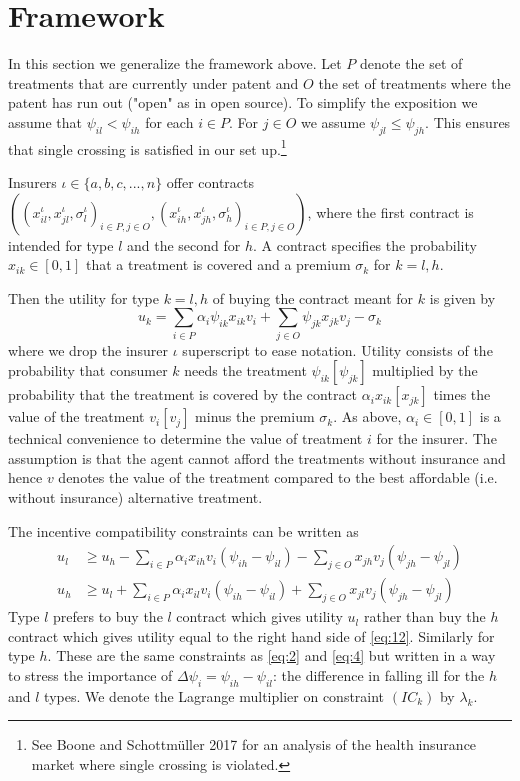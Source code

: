 \documentclass[a4paper,12pt]{article}
\makeatletter
\newcommand{\citeprocitem}[2]{\hyper@linkstart{cite}{citeproc_bib_item_#1}#2\hyper@linkend}
\makeatother
\begin{document}
\section{Framework}
\label{sec:org62fbe65}

In this section we generalize the framework above. Let \(P\) denote the set of treatments that are currently under patent and \(O\) the set of treatments where the patent has run out ("open" as in open source). To simplify the exposition we assume that \(\psi_{il}<\psi_{ih}\) for each \(i \in P\). For \(j \in O\) we assume \(\psi_{jl} \leq \psi_{jh}\). This ensures that single crossing is satisfied in our set up.\footnote{See Boone and Schottmüller \citeprocitem{4}{2017} for an analysis of the health insurance market where single crossing is violated.}

Insurers \(\iota \in \{a,b,c,...,n\}\) offer contracts \(((x_{il}^{\iota},x_{jl}^{\iota},\sigma_l^{\iota})_{i \in P, j \in O},(x_{ih}^{\iota},x_{jh}^{\iota},\sigma_h^{\iota})_{i \in P, j \in O})\), where the first contract is intended for type \(l\) and the second for \(h\). A contract specifies the probability \(x_{ik} \in [0,1]\) that a treatment is covered and a premium \(\sigma_k\) for \(k=l,h\).

Then the utility for type \(k=l,h\) of buying the contract meant for \(k\) is given by
\begin{equation}
\label{eq:11}
u_k = \sum_{i \in P} \alpha_i \psi_{ik} x_{ik} v_i + \sum_{j \in O} \psi_{jk} x_{jk} v_j - \sigma_k
\end{equation}
where we drop the insurer \(\iota\) superscript to ease notation. Utility consists of the probability that consumer \(k\) needs the treatment \(\psi_{ik} [\psi_{jk}]\) multiplied by the probability that the treatment is covered by the contract \(\alpha_i x_{ik} [x_{jk}]\) times the value of the treatment \(v_i [v_j]\) minus the premium \(\sigma_k\). As above, \(\alpha_i \in [0,1]\) is a technical convenience to determine the value of treatment \(i\) for the insurer. The assumption is that the agent cannot afford the treatments without insurance and hence \(v\) denotes the value of the treatment compared to the best affordable (i.e. without insurance) alternative treatment.

The incentive compatibility constraints can be written as
\begin{align}
\label{eq:12} \tag{$IC_l$}
u_l &\geq  u_h - \sum_{i \in P} \alpha_i x_{ih} v_i (\psi_{ih}-\psi_{il}) - \sum_{j \in O} x_{jh} v_j (\psi_{jh}-\psi_{jl})  \\
\label{eq:12a} \tag{$IC_h$}
u_h &\geq  u_l + \sum_{i \in P} \alpha_i x_{il} v_i (\psi_{ih}-\psi_{il}) + \sum_{j \in O} x_{jl} v_j (\psi_{jh}-\psi_{jl})
\end{align}
Type \(l\) prefers to buy the \(l\) contract which gives utility \(u_l\) rather than buy the \(h\) contract which gives utility equal to the right hand side of \eqref{eq:12}. Similarly for type \(h\). These are the same constraints as \eqref{eq:2} and \eqref{eq:4} but written in a way to stress the importance of \(\Delta \psi_i = \psi_{ih}-\psi_{il}\): the difference in falling ill for the \(h\) and \(l\) types. We denote the Lagrange multiplier on constraint \((IC_k)\) by \(\lambda_k\).
\end{document}
